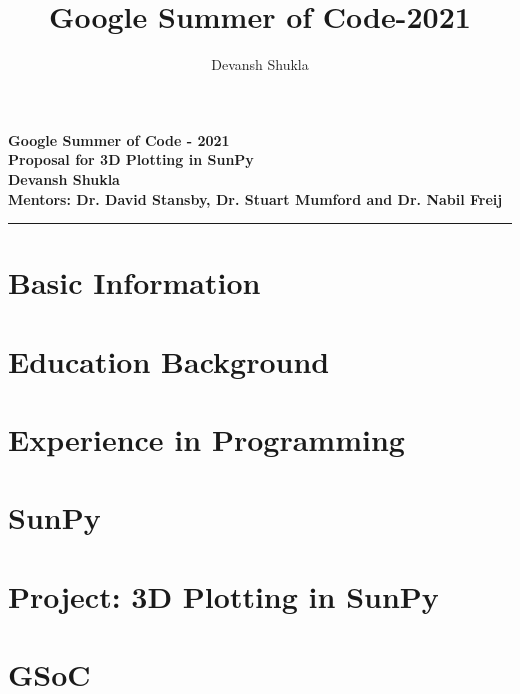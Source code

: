 \documentclass[a4paper, 10pt]{article}
\title{{\Large\textbf{Google Summer of Code-2021}}}
\author{Devansh Shukla}
\date{}
\numberwithin{equation}{section}
\begin{document}
	
	\begin{center}
		{\Large\textbf{Google Summer of Code - 2021}} \\
		\vspace*{0.4cm}
		{\large\textbf{Proposal for 3D Plotting in SunPy}} \\
		\vspace*{0.25cm}
		{\textbf{Devansh Shukla}} \\
		\vspace*{0.25cm}
		{\textbf{Mentors: Dr. David Stansby, Dr. Stuart Mumford and Dr. Nabil Freij}} 
		{\rule{\textwidth}{1pt}}
	\end{center}

	\section{Basic Information}
		
	
	\section{Education Background}
		

	\section{Experience in Programming}
		

	\section{SunPy}
		
		
		
		

	\section{Project: 3D Plotting in SunPy}
		
		
		
		
		
			
	\section{GSoC}
		
	
\end{document}
